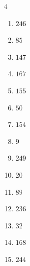 \begin{multicols}{4}
\begin{enumerate}

  \item $246$


  \item $85$


  \item $147$


  \item $167$


\columnbreak %

  \item $155$


  \item $50$


  \item $154$


  \item $9$


  \item $249$


  \item $20$


  \item $89$


  \item $236$


  \item $32$


  \item $168$


  \item $244$



\end{enumerate}
\end{multicols}
